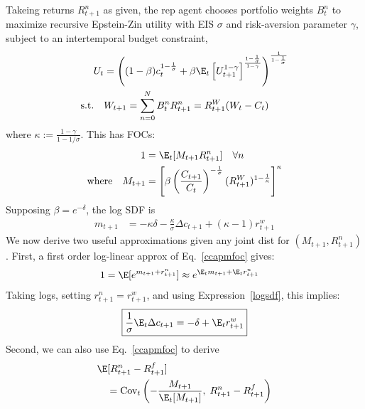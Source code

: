 \documentclass[12pt]{article}
\theoremstyle{plain}
\theoremstyle{definition}
\theoremstyle{remark}
\newcommand{\Cov}{\operatorname{Cov}}
\begin{document}
\begin{multicols*}{2}
Takeing returns $R^n_{t+1}$ as given,
the rep agent chooses portfolio weights $B_t^n$ to maximize recursive
Epstein-Zin utility with EIS $\sigma$ and risk-aversion parameter
$\gamma$, subject to an intertemporal budget constraint,
\begin{align*}
  U_t
  &=
  \left(
  (1-\beta)c_t^{1-\frac{1}{\sigma}}
  + \beta
  \E_t\left[U_{t+1}^{1-\gamma}\right]^{\frac{1-\frac{1}{\sigma}}{1-\gamma}}
  \right)^{\frac{1}{1-\frac{1}{\sigma}}}
  \\
  \text{s.t.}\quad&
  W_{t+1}
  =
  \sum_{n=0}^N B_t^n R_{t+1}^n
  =
  R^W_{t+1}(W_t-C_t)
\end{align*}
where $\kappa := \frac{1-\gamma}{1-1/\sigma}$.
This has FOCs:
\begin{align}
  1 &= \E_t[M_{t+1}R_{t+1}^n]
  \quad \forall n
  \label{ccapmfoc}
  \\
  \text{where}\quad
  M_{t+1}
  &=
  \left[
  \beta \left(
  \frac{C_{t+1}}{C_t}
  \right)^{-\frac{1}{\sigma}}
  (R^W_{t+1})^{1-\frac{1}{\kappa}}
  \right]^\kappa
  \notag
\end{align}
Supposing $\beta=e^{-\delta}$, the log SDF is
\begin{align}
  m_{t+1}
  &=
  -\kappa
  \delta
  -
  \frac{\kappa}{\sigma}
  \Delta c_{t+1}
  +
  \left(
  \kappa-1
  \right)
  r^w_{t+1}
  \label{logsdf}
\end{align}
We now derive two useful approximations given any joint dist for
$(M_{t+1},R_{t+1}^n)$.
First, a first order log-linear approx of Eq.~\ref{ccapmfoc} gives:
\begin{align}
  1
  &=
  \E[e^{m_{t+1}+r_{t+1}^n}]
  \approx e^{\E_tm_{t+1}+\E_tr^n_{t+1}}
  \notag
\end{align}
Taking logs, setting $r_{t+1}^n=r_{t+1}^w$, and using
Expression~\ref{logsdf}, this implies:
\begin{align}
  \boxed{
  \frac{1}{\sigma}\E_t\Delta c_{t+1}
  =
  - \delta + \E_tr_{t+1}^w
  }
  \label{ezeuler}
\end{align}
Second, we can also use Eq.~\ref{ccapmfoc} to derive
\begin{align*}
  &\E[R_{t+1}^n-R_{t+1}^f]
  \\
  &\quad
  =
  \Cov_t\left(
  -\frac{M_{t+1}}{\E_t[M_{t+1}]},
  \;R_{t+1}^n-R_{t+1}^f
  \right)
\end{align*}

\end{multicols*}
\end{document}
